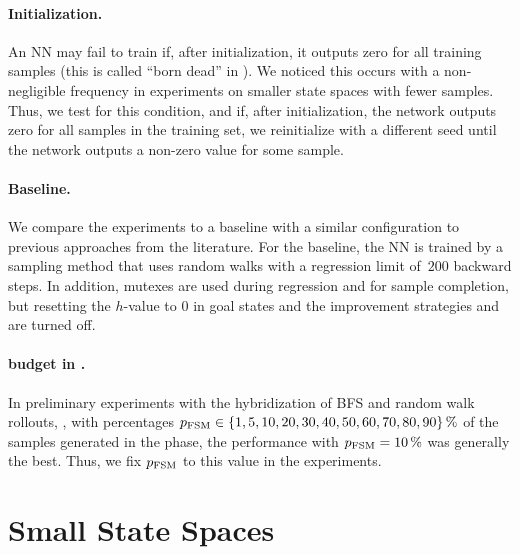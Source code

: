 \paragraph{Initialization.}
\label{sec:nn_initialization}

An NN may fail to train if, after initialization, it outputs zero for all training samples (this is called ``born dead'' in \citeyear{Lu.etal/2020}). We noticed this occurs with a non-negligible frequency in experiments on smaller state spaces with fewer samples. Thus, we test for this condition, and if, after initialization, the network outputs zero for all samples in the training set, we reinitialize with a different seed until the network outputs a non-zero value for some sample.

\paragraph{Baseline.}
\label{sec:baseline}

We compare the experiments to a baseline \hnnbase with a similar configuration to previous approaches from the literature. For the baseline, the NN is trained by a sampling method that uses random walks with a regression limit of~$200$ backward steps. In addition, mutexes are used during regression and for sample completion, but resetting the $h$-value to $0$ in goal states and the improvement strategies \hmin and \hvfc are turned off.

\paragraph{\bfs budget in \bfsrw.}
\label{sec:bfsrw_budget}

In preliminary experiments with the hybridization of BFS and random walk rollouts, \bfsrw, with percentages $p_{\text{FSM}}\in\{1,5,10,20,30,40,50,60,70,80,90\}\,\%$ of the samples generated in the \bfs phase, the performance with $p_{\text{FSM}}=10\,\%$ was generally the best. Thus, we fix $p_{\text{FSM}}$ to this value in the experiments.

\section{Small State Spaces}
\label{sec:experiment1}

